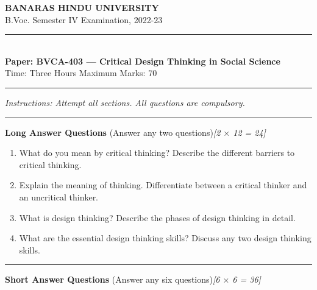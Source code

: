 \documentclass[11pt,a4paper]{article}
\newcommand{\pts}[1]{\hfill   \textit{[#1]}}
\begin{document}
\begin{center}
  {\large\bfseries BANARAS HINDU UNIVERSITY}\\[2pt]
  {\normalsize B.Voc. Semester IV Examination, 2022-23}\\[6pt]
  \rule{0.8\linewidth}{0.5pt}\\[6pt]
  {\large\bfseries Paper: BVCA-403 --- Critical Design Thinking in Social Science}\\[4pt]
  {\normalsize Time: Three Hours \hfill Maximum Marks: 70}
\end{center}

\rule{\linewidth}{0.4pt}

\smallskip



\noindent   \textit{Instructions: Attempt all sections. All questions are compulsory.}

\bigskip

\bigskip



\rule{\linewidth}{0.4pt}\smallskip




\noindent   \textbf{Long Answer Questions} (Answer any two questions)\pts{2 $ \times$ 12 = 24}

\begin{enumerate}[label=\arabic*.,leftmargin=*,itemsep=8pt]
  \item What do you mean by critical thinking? Describe the different barriers to critical thinking.
  \item Explain the meaning of thinking. Differentiate between a critical thinker and an uncritical thinker.
  \item What is design thinking? Describe the phases of design thinking in detail.
  \item What are the essential design thinking skills? Discuss any two design thinking skills.
\end{enumerate}

\bigskip



\rule{\linewidth}{0.4pt}\smallskip




\noindent   \textbf{Short Answer Questions} (Answer any six questions)\pts{6 $ \times$ 6 = 36}
\end{document}
